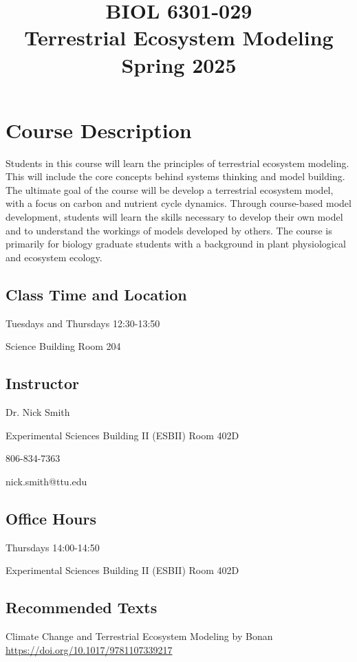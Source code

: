 \documentclass[12pt, notitlepage]{article}   	%
\title{
	\textbf{
		BIOL 6301-029
	} \\
	\large Terrestrial Ecosystem Modeling \\
	\large Spring 2025
}
\date{\vspace{-5ex}}
\begin{document}
{\selectfont %

\maketitle

\section{Course Description}
Students in this course will learn the principles of terrestrial ecosystem modeling.
This will include the core concepts behind systems thinking and model building.
The ultimate goal of the course will be develop a terrestrial ecosystem model, with
a focus on carbon and nutrient cycle dynamics. Through course-based model development,
students will learn the skills necessary to develop their own model and to understand
the workings of models developed by others. The course is primarily for biology
graduate students with a background in plant physiological and ecosystem ecology.

\subsection{Class Time and Location}
Tuesdays and Thursdays 12:30-13:50

Science Building Room 204

\subsection{Instructor}
Dr. Nick Smith \par
Experimental Sciences Building II (ESBII) Room 402D \par
806-834-7363 \par
nick.smith@ttu.edu \par

\subsection{Office Hours}
Thursdays 14:00-14:50 \par
Experimental Sciences Building II (ESBII) Room 402D \par

\subsection{Recommended Texts}
Climate Change and Terrestrial Ecosystem Modeling
by Bonan
\url{https://doi.org/10.1017/9781107339217}\par

}
\end{document}
